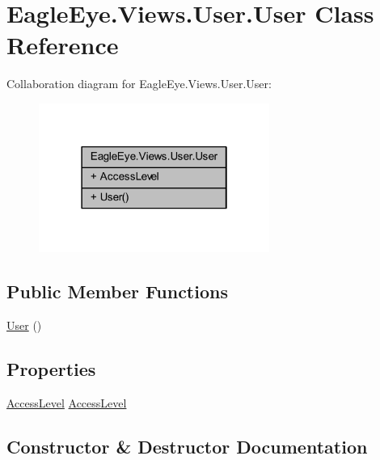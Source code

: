 \hypertarget{class_eagle_eye_1_1_views_1_1_user_1_1_user}{}\section{Eagle\+Eye.\+Views.\+User.\+User Class Reference}
\label{class_eagle_eye_1_1_views_1_1_user_1_1_user}


Collaboration diagram for Eagle\+Eye.\+Views.\+User.\+User\+:\nopagebreak
\begin{figure}[H]
\begin{center}
\leavevmode
\includegraphics[width=214pt]{class_eagle_eye_1_1_views_1_1_user_1_1_user__coll__graph}
\end{center}
\end{figure}
\subsection*{Public Member Functions}
\begin{DoxyCompactItemize}
\item 
\mbox{\hyperlink{class_eagle_eye_1_1_views_1_1_user_1_1_user_afaf7ca813d3573cb9a84ac392cfc5901}{User}} ()
\end{DoxyCompactItemize}
\subsection*{Properties}
\begin{DoxyCompactItemize}
\item 
\mbox{\hyperlink{namespace_eagle_eye_1_1_views_1_1_user_a5ec08150416703595770d50460878d89}{Access\+Level}} \mbox{\hyperlink{class_eagle_eye_1_1_views_1_1_user_1_1_user_ad00af0bd442d99c28dd3068240226053}{Access\+Level}}
\end{DoxyCompactItemize}


\subsection{Constructor \& Destructor Documentation}
\mbox{\label{class_eagle_eye_1_1_views_1_1_user_1_1_user_afaf7ca813d3573cb9a84ac392cfc5901}} 

